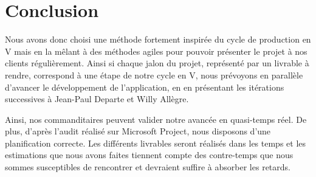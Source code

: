 \section{Conclusion}

Nous avons donc choisi une méthode fortement inspirée du cycle de production en V mais en la mêlant à des méthodes agiles pour pouvoir présenter le projet à nos clients régulièrement. Ainsi si chaque jalon du projet, représenté par un livrable à rendre, correspond à une étape de notre cycle en V, nous prévoyons en parallèle d'avancer le développement de l'application, en en présentant les itérations successives à Jean-Paul Departe et Willy Allègre. \newline

Ainsi, nos commanditaires peuvent valider notre avancée en quasi-temps réel. De plus, d'après l'audit réalisé sur Microsoft Project, nous disposons d'une planification correcte. Les différents livrables seront réalisés dans les temps et les estimations que nous avons faites tiennent compte des contre-temps que nous sommes susceptibles de rencontrer et devraient suffire à absorber les retards.